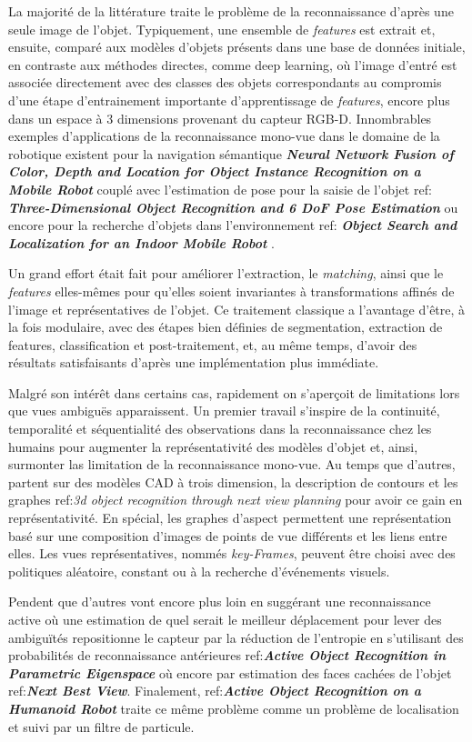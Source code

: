 La majorité de la littérature traite le problème de la reconnaissance d'après une seule image de l'objet. Typiquement, une ensemble de \textit{features} est extrait et, ensuite, comparé aux modèles d'objets présents dans une base de données initiale, en contraste aux méthodes directes, comme deep learning, où l'image d'entré est associée directement avec des classes des objets correspondants au compromis d'une étape d'entrainement importante d'apprentissage de \textit {features}, encore plus dans un espace à 3 dimensions provenant du capteur RGB-D. Innombrables exemples d'applications de la reconnaissance mono-vue dans le domaine de la robotique existent pour la navigation sémantique 
\textbf{\textit{Neural Network Fusion of Color, Depth and Location for Object Instance Recognition on a Mobile Robot}} couplé avec l'estimation de pose pour la saisie de l'objet ref: \textbf{\textit{Three-Dimensional Object Recognition and 6 DoF Pose Estimation}} ou encore pour la recherche d'objets dans l'environnement ref: \textbf{\textit{Object Search and Localization for an Indoor Mobile Robot}} .

Un grand effort était fait pour améliorer l'extraction, le \textit {matching}, ainsi que le \textit{features} elles-mêmes pour qu'elles soient invariantes à transformations affinés de l'image et représentatives de l'objet. Ce traitement classique a l’avantage d'être, à la fois modulaire, avec des étapes bien définies de segmentation, extraction de features, classification et post-traitement, et, au même temps, d'avoir des résultats satisfaisants d'après une implémentation plus immédiate. 



Malgré son intérêt dans certains cas, rapidement on s'aperçoit de limitations lors que vues ambiguës apparaissent. Un premier travail s'inspire de la continuité, temporalité et séquentialité des observations dans la reconnaissance chez les humains pour augmenter la représentativité des modèles d'objet et, ainsi, surmonter las limitation de la reconnaissance mono-vue. Au temps que d'autres, partent sur des modèles CAD à trois dimension, la description de contours et les graphes ref:\textit{3d object recognition through next view planning} pour avoir ce gain en représentativité. En spécial, les graphes d'aspect permettent une représentation basé sur une composition d'images de points de vue différents et les liens entre elles.  Les vues représentatives, nommés \textit{key-Frames}, peuvent être choisi avec des politiques aléatoire, constant ou à la recherche d'événements visuels.
  
Pendent que d'autres vont encore plus loin en suggérant une reconnaissance active où une estimation de quel serait le meilleur déplacement pour lever des ambiguïtés repositionne le capteur par la réduction de l'entropie en s'utilisant des probabilités de reconnaissance antérieures  ref:\textbf{\textit{Active Object Recognition in Parametric Eigenspace}} où encore par estimation des faces cachées de l'objet ref:\textbf{\textit{Next Best View}}. Finalement, ref:\textbf{\textit{Active Object Recognition on a Humanoid Robot}} traite ce même problème comme un problème de localisation et suivi par un filtre de particule.





